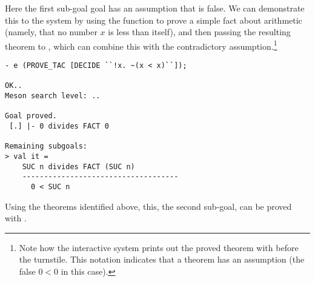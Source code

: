     Here the first sub-goal goal has an assumption that is false.  We
    can demonstrate this to the system by using the 
    function to prove a simple fact about arithmetic (namely, that no
    number $x$ is less than itself), and then passing the resulting
    theorem to , which can combine this with the
    contradictory assumption.\footnote{Note how the interactive system
      prints out the proved theorem with \ml{[.]} before the
      turnstile.  This notation indicates that a theorem has an
    assumption (the false $0 < 0$ in this case).}

\begin{session}\begin{verbatim}
- e (PROVE_TAC [DECIDE ``!x. ~(x < x)``]);

OK..
Meson search level: ..

Goal proved.
 [.] |- 0 divides FACT 0

Remaining subgoals:
> val it =
    SUC n divides FACT (SUC n)
    ------------------------------------
      0 < SUC n
\end{verbatim}\end{session}
Using the theorems identified above, this, the second sub-goal, can
be proved with .

